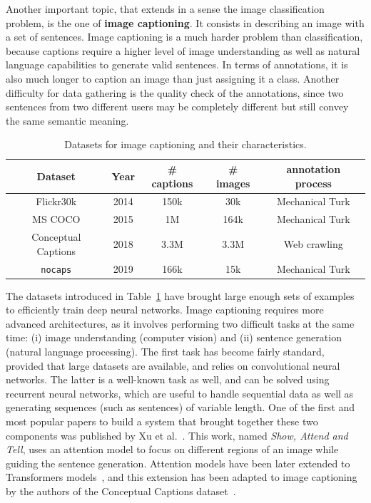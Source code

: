 Another important topic, that extends in a sense the image classification problem,
is the one of \textbf{image captioning}.
It consists in describing an image with a set of sentences.
Image captioning is a much harder problem than classification,
because captions require a higher level of image understanding as well as
natural language capabilities to generate valid sentences.
In terms of annotations, it is also much longer to caption
an image than just assigning it a class.
Another difficulty for data gathering is the quality check of the annotations,
since two sentences from two different users may be
completely different but still convey the same semantic meaning.

\vspace{0.5cm}
\begin{table}
	\centering
	\caption{Datasets for image captioning and their characteristics.}
	\begin{tabular}{|c|c|c|c|c|}
		\hline
		Dataset & Year & \# captions & \# images & annotation process \\
		\hline
		Flickr30k \cite{flickr30k} & 2014 & 150k & 30k & Mechanical Turk \\
		MS COCO \cite{chen2015microsoft} & 2015 & 1M & 164k & Mechanical Turk \\
		Conceptual Captions \cite{sharma-etal-2018-conceptual} & 2018 & 3.3M & 3.3M & Web crawling \\
		\texttt{nocaps} \cite{agrawal2019nocaps} & 2019 &  166k & 15k & Mechanical Turk \\
		\hline
	\end{tabular}
	\label{tab:caption_ds}
\end{table}

The datasets introduced in Table~\ref{tab:caption_ds} have brought
large enough sets of examples to efficiently train deep neural networks.
Image captioning requires more advanced architectures,
as it involves performing two difficult tasks at the same time:
(i) image understanding (computer vision) and
(ii) sentence generation (natural language processing).
The first task has become fairly standard, provided that large datasets are available,
and relies on convolutional neural networks.
The latter is a well-known task as well,
and can be solved using recurrent neural networks,
which are useful to handle sequential data as well as generating sequences
(such as sentences) of variable length.
One of the first and most popular papers to build a system
that brought together these two components was published by Xu et al.~\cite{xu2015show}.
This work, named \textit{Show, Attend and Tell}, uses an attention model
to focus on different regions of an image while guiding the sentence generation.
Attention models have been later extended to
Transformers models~\cite{vaswani2017attention},
and this extension has been adapted to image captioning by
the authors of the Conceptual Captions dataset~\cite{sharma-etal-2018-conceptual}.

